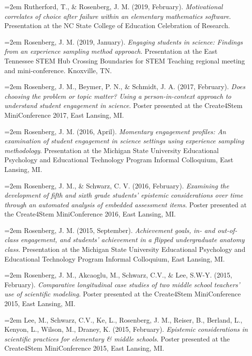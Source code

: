 \documentclass[
  14,
]{article}
\begin{document}
\hangindent=2em Rutherford, T., \& Rosenberg, J. M. (2019, February).
\emph{Motivational correlates of choice after failure within an
elementary mathematics software}. Presentation at the NC State College
of Education Celebration of Research.

\hangindent=2em Rosenberg, J. M. (2019, January). \emph{Engaging
students in science: Findings from an experience sampling method
approach}. Presentation at the East Tennessee STEM Hub Crossing
Boundaries for STEM Teaching regional meeting and mini-conference.
Knoxville, TN.

\hangindent=2em Rosenberg, J. M., Beymer, P. N., \& Schmidt, J. A.
(2017, February). \emph{Does choosing the problem or topic matter? Using
a person-in-context approach to understand student engagement in
science}. Poster presented at the Create4Stem MiniConference 2017, East
Lansing, MI.

\hangindent=2em Rosenberg, J. M. (2016, April). \emph{Momentary
engagement profiles: An examination of student engagement in science
settings using experience sampling methodology}. Presentation at the
Michigan State University Educational Psychology and Educational
Technology Program Informal Colloquium, East Lansing, MI.

\hangindent=2em Rosenberg, J. M., \& Schwarz, C. V. (2016, February).
\emph{Examining the development of fifth and sixth grade students'
epistemic considerations over time through an automated analysis of
embedded assessment items}. Poster presented at the Create4Stem
MiniConference 2016, East Lansing, MI.

\hangindent=2em Rosenberg, J. M. (2015, September). \emph{Achievement
goals, in- and out-of-class engagement, and students' achievement in a
flipped undergraduate anatomy class}. Presentation at the Michigan State
University Educational Psychology and Educational Technology Program
Informal Colloquium, East Lansing, MI.

\hangindent=2em Rosenberg, J. M., Akcaoglu, M., Schwarz, C.V., \& Lee,
S.W-Y. (2015, February). \emph{Comparative longitudinal case studies of
two middle school teachers' use of scientific modeling}. Poster
presented at the Create4Stem MiniConference 2015, East Lansing, MI.

\hangindent=2em Lee, M., Schwarz, C.V., Ke, L., Rosenberg, J. M.,
Reiser, B., Berland, L., Kenyon, L., Wilson, M., Draney, K. (2015,
February). \emph{Epistemic considerations in scientific practices for
elementary \& middle schools}. Poster presented at the Create4Stem
MiniConference 2015, East Lansing, MI.
\end{document}
